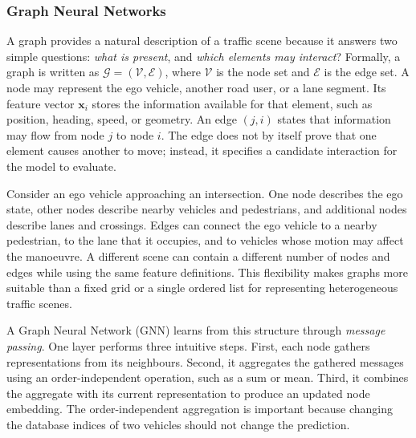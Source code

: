 \subsubsection{Graph Neural Networks}

A graph provides a natural description of a traffic scene because it answers two simple questions: \textit{what is present}, and \textit{which elements may interact}? Formally, a graph is written as \(\mathcal{G}=(\mathcal{V},\mathcal{E})\), where \(\mathcal{V}\) is the node set and \(\mathcal{E}\) is the edge set. A node may represent the ego vehicle, another road user, or a lane segment. Its feature vector \(\mathbf{x}_i\) stores the information available for that element, such as position, heading, speed, or geometry. An edge \((j,i)\) states that information may flow from node \(j\) to node \(i\). The edge does not by itself prove that one element causes another to move; instead, it specifies a candidate interaction for the model to evaluate.

Consider an ego vehicle approaching an intersection. One node describes the ego state, other nodes describe nearby vehicles and pedestrians, and additional nodes describe lanes and crossings. Edges can connect the ego vehicle to a nearby pedestrian, to the lane that it occupies, and to vehicles whose motion may affect the manoeuvre. A different scene can contain a different number of nodes and edges while using the same feature definitions. This flexibility makes graphs more suitable than a fixed grid or a single ordered list for representing heterogeneous traffic scenes.

A Graph Neural Network (GNN) learns from this structure through \textit{message passing}. One layer performs three intuitive steps. First, each node gathers representations from its neighbours. Second, it aggregates the gathered messages using an order-independent operation, such as a sum or mean. Third, it combines the aggregate with its current representation to produce an updated node embedding. The order-independent aggregation is important because changing the database indices of two vehicles should not change the prediction.

